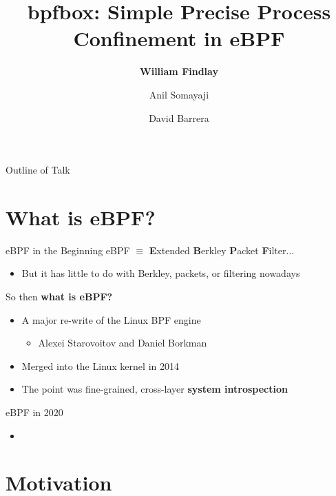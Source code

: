 \documentclass[12pt, dvipsnames]{beamer}
\title{bpfbox: Simple Precise Process Confinement in eBPF}
\author{\textbf{William Findlay} \and Anil Somayaji \and David Barrera}
\institute{Carleton University\\\url{will@ccsl.carleton.ca}}
\begin{document}

\begin{frame}
\titlepage
\end{frame}

\setwatermark[hoffset=6cm, voffset=0.3cm]{}


\begin{frame}{Outline of Talk}
    \tableofcontents
\end{frame}

\section{What is eBPF?}

\begin{frame}[c]{eBPF in the Beginning}
eBPF $\equiv$ \textbf{E}xtended \textbf{B}erkley \textbf{P}acket \textbf{F}ilter...
\begin{itemize}
    \item But it has little to do with Berkley, packets, or filtering nowadays
\end{itemize}
\vfill
So then \textbf{what is eBPF?}
\begin{itemize}
    \item A major re-write of the Linux BPF engine
    \begin{itemize}
        \item Alexei Starovoitov and Daniel Borkman
    \end{itemize}
    \item Merged into the Linux kernel in 2014
    \item The point was fine-grained, cross-layer \textbf{system introspection}
\end{itemize}
\end{frame}

\begin{frame}[t]{eBPF in 2020}
    \begin{itemize}
        \item
    \end{itemize}
\end{frame}

\section{Motivation}

\end{document}
